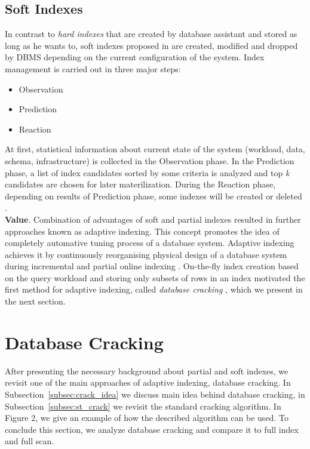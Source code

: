 \documentclass[10pt, conference, compsocconf]{IEEEtran}
\begin{document}
\subsection{Soft Indexes}
\label{subsec:soft}
In contrast to \emph{hard indexes} that are created by database assistant and stored as long as he wants to, soft indexes proposed in \cite{soft_indexes} are created, modified and dropped by DBMS depending on the current configuration of the system. Index management is carried out in three major steps:
\begin{itemize}
\item{Observation}
\item{Prediction}
\item{Reaction}
\end{itemize}

At first, statistical information about current state of the system (workload, data, schema, infrastructure) is collected in the Observation phase. In the Prediction phase, a list of index candidates sorted by some criteria is analyzed and top \textit{k} candidates are chosen for later materilization. During the Reaction phase, depending on results of Prediction phase, some indexes will be created or deleted \cite{soft_indexes}.\\

\textbf{Value}. Combination of advantages of soft and partial indexes resulted in further approaches known as adaptive indexing. This concept promotes the idea of completely automative tuning process of a database system. Adaptive indexing achieves it by continuously reorganising physical design of a database system during incremental and partial online indexing \cite{defin}. On-the-fly index creation based on the query workload and storing only subsets of rows in an index motivated the first method for adaptive indexing, called \emph{database cracking} \cite{cracking}, which we present in the next section.

\section{Database Cracking}
\label{sec:cracking}
After presenting the necessary background about partial and soft indexes, we revisit one of the main approaches of adaptive indexing, database cracking. In Subsection~\ref{subsec:crack_idea} we discuss main idea behind database cracking, in Subsection~\ref{subsec:st_crack} we revisit the standard cracking algorithm. In Figure 2, we give an example of how the described algorithm can be used. To conclude this section, we analyze database cracking and compare it to full index and full scan.
\end{document}
